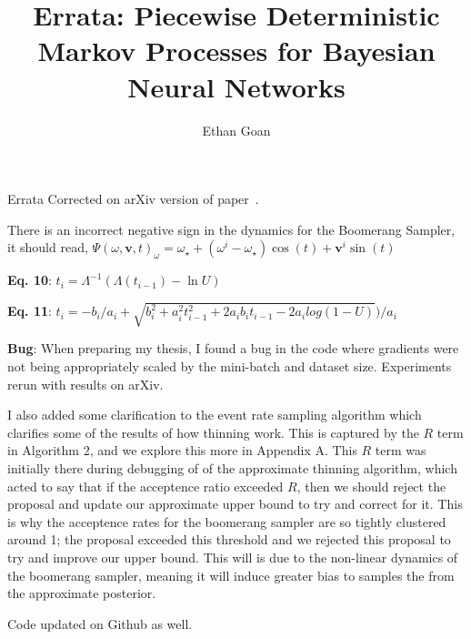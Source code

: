 \documentclass{article}
\title{{\titlefont Errata: Piecewise Deterministic Markov Processes for Bayesian Neural Networks}}
\author{{\authorfont Ethan Goan}}
\date{} %
\begin{document}
\maketitle
\thispagestyle{fancy} %
Errata Corrected on arXiv version of paper~\cite{goan2023piecewise}.


There is an incorrect negative sign in the dynamics for the Boomerang Sampler, it should read,
$\Psi(\omega, \mathbf{v}, t)_{\omega} = \omega_{\star} + (\omega^{i} - \omega_{\star})\cos(t) + \mathbf{v}^{i}\sin(t)$

\textbf{Eq. 10}: $t_{i} = \Lambda^{-1}(\Lambda(t_{i-1}) - \ln U)$

\textbf{Eq. 11}: $t_{i} =  -b_{i} / a_{i} + \sqrt{b_{i}^{2} +  a_{i}^{2}t_{i-1}^{2} + 2a_{i}b_{i}t_{i-1} - 2a_{i}log(1 - U)}\big ) /a_{i}$

\textbf{Bug}: When preparing my thesis, I found a bug in the code where gradients were not being appropriately scaled by the mini-batch and dataset size. Experiments rerun with results on arXiv.

I also added some clarification to the event rate sampling algorithm which clarifies some of the results of how thinning work. This is captured by the $R$ term in Algorithm 2, and we explore this more in Appendix A. This $R$ term was initially there during debugging of of the approximate thinning algorithm, which acted to say that if the acceptence ratio exceeded $R$, then we should reject the proposal and update our approximate upper bound to try and correct for it. This is why the acceptence rates for the boomerang sampler are so tightly clustered around 1; the proposal exceeded this threshold and we rejected this proposal to try and improve our upper bound. This will is due to the non-linear dynamics of the boomerang sampler, meaning it will induce greater bias to samples the from the approximate posterior.

Code updated on Github as well.


\end{document}

